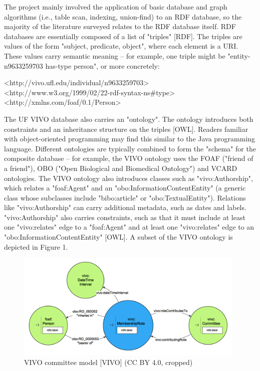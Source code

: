\documentclass[11pt]{article}
\begin{document}
The project mainly involved the application of basic database and graph algorithms (i.e., table scan, indexing, union-find) to an RDF database, so the majority of the literature surveyed relates to the RDF database itself. RDF databases are essentially composed of a list of "triples" [RDF]. The triples are values of the form "subject, predicate, object", where each element is a URI. These values carry semantic meaning -- for example, one triple might be "entity-n9633259703 has-type person", or more concretely:

<http://vivo.ufl.edu/individual/n9633259703> <http://www.w3.org/1999/02/22-rdf-syntax-ns\#type> <http://xmlns.com/foaf/0.1/Person>

The UF VIVO database also carries an "ontology". The ontology introduces both constraints and an inheritance structure on the triples [OWL]. Readers familiar with object-oriented programming may find this similar to the Java programming language. Different ontologies are typically combined to form the "schema" for the composite database -- for example, the VIVO ontology uses the FOAF ("friend of a friend"), OBO ("Open Biological and Biomedical Ontology") and VCARD ontologies. The VIVO ontology also introduces classes such as "vivo:Authorship", which relates a "foaf:Agent" and an "obo:InformationContentEntity" (a generic class whose subclasses include "bibo:article" or "obo:TextualEntity"). Relations like "vivo:Authorship" can carry additional metadata, such as dates and labels. "vivo:Authorship" also carries constraints, such as that it must include at least one "vivo:relates" edge to a "foaf:Agent" and at least one "vivo:relates" edge to an "obo:InformationContentEntity" [OWL]. A subset of the VIVO ontology is depicted in Figure 1.

\begin{figure}[h!]
\centering
\includegraphics[width=11cm]{membership-model.png}
\caption{VIVO committee model [VIVO] (CC BY 4.0, cropped)}
\label{fig:output}
\end{figure}
\end{document}
